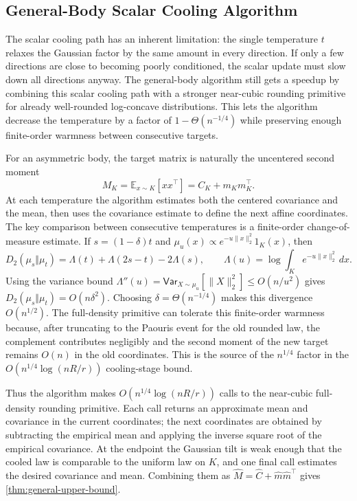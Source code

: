 \documentclass[11pt]{article}
\numberwithin{equation}{section}
\theoremstyle{definition}
\newcommand{\E}[2]{\mathbb{E}_{#1}\left[#2\right]}
\newcommand{\V}[2]{\mathsf{Var}_{#1}\left[#2\right]}
\begin{document}
\subsection{General-Body Scalar Cooling Algorithm}

The scalar cooling path has an inherent limitation: the single temperature $t$
relaxes the Gaussian factor by the same amount in every direction.
If only a few directions are close to becoming poorly conditioned, the scalar
update must slow down all directions anyway.
The general-body algorithm still gets a speedup by combining this scalar cooling
path with a stronger near-cubic rounding primitive for already well-rounded
log-concave distributions.
This lets the algorithm decrease the temperature by a factor of
$1-\Theta(n^{-1/4})$ while preserving enough finite-order warmness between
consecutive targets.

For an asymmetric body, the target matrix is naturally the uncentered second
moment
\[
M_K
=\E{x\sim K}{xx^\top}
=C_K+m_Km_K^\top.
\]
At each temperature the algorithm estimates both the centered covariance and the
mean, then uses the covariance estimate to define the next affine coordinates.
The key comparison between consecutive temperatures is a finite-order
change-of-measure estimate.
If $s=(1-\delta)t$ and
$\mu_u(x)\propto e^{-u\|x\|_2^2}1_K(x)$, then
\[
D_2(\mu_s\Vert\mu_t) =\Lambda(t)+\Lambda(2s-t)-2\Lambda(s),
\qquad
\Lambda(u)=\log\int_K e^{-u\|x\|_2^2}\,dx.
\]
Using the variance bound $\Lambda''(u)=\V{X\sim\mu_u}{\|X\|_2^2}\le O(n/u^2)$
gives
$D_2(\mu_s\Vert\mu_t)=O(n\delta^2)$.
Choosing $\delta=\Theta(n^{-1/4})$ makes this divergence
$O(n^{1/2})$.
The full-density primitive can tolerate this finite-order warmness because,
after truncating to the Paouris event for the old rounded law, the complement
contributes negligibly and the second moment of the new target remains $O(n)$ in
the old coordinates.
This is the source of the $n^{1/4}$ factor in the
$O(n^{1/4}\log(nR/r))$ cooling-stage bound.

Thus the algorithm makes $O(n^{1/4}\log(nR/r))$ calls to the near-cubic
full-density rounding primitive.
Each call returns an approximate mean and covariance in the current coordinates;
the next coordinates are obtained by subtracting the empirical mean and applying
the inverse square root of the empirical covariance.
At the endpoint the Gaussian tilt is weak enough that the cooled law is
comparable to the uniform law on $K$, and one final call estimates the desired
covariance and mean.
Combining them as $\widehat M=\widehat C+\widehat m\widehat m^\top$ gives
\cref{thm:general-upper-bound}.
\end{document}
